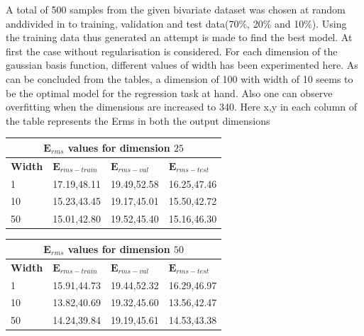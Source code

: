 A total of 500 samples from the given bivariate dataset was chosen at random anddivided  in  to  training,  validation  and  test  data(70\%,  20\%  and  10\%).   Using  the training data thus generated an attempt is made to find the best model.  At first the case without regularisation is considered.  For each dimension of the gaussian basis function, different values of width has been experimented here.  As can be concluded from the tables, a dimension of 100 with width of 10 seems to be the optimal model for the regression task at hand. Also one can observe overfitting when the dimensions are increased to 340. Here x,y in each column of the table represents the Erms in both the output dimensions

\newpage
{
\begin{table}[hptb]
\begin{tabular}{ |p{1.5cm}|p{3cm}|p{3cm}| p{3cm}|  }
\hline
\multicolumn{4}{|c|}{$\mathbf{E}_{rms}$ values for dimension $25$ } \\
\hline
\rowcolor{lightgray} \textbf{Width} & $\mathbf{E}_{rms-train}$ & $\mathbf{E}_{rms-val}$ & $\mathbf{E}_{rms-test}$ \\
\hline
  1   &   17.19,48.11   &    19.49,52.58      &     16.25,47.46 \\
 \hline
 10   &   15.23,43.45  &  19.17,45.01          &     15.50,42.72 \\
 \hline
 50   &   15.01,42.80  & 19.52,45.40 & 15.16,46.30 \\
\hline
\end{tabular}
\label{table:8}
\end{table}
}

{
\begin{table}[hptb]
\begin{tabular}{ |p{1.5cm}|p{3cm}|p{3cm}| p{3cm}|  }
\hline
\multicolumn{4}{|c|}{$\mathbf{E}_{rms}$ values for dimension $50$ } \\
\hline
\rowcolor{lightgray} \textbf{Width} & $\mathbf{E}_{rms-train}$ & $\mathbf{E}_{rms-val}$ & $\mathbf{E}_{rms-test}$ \\
\hline
  1   &   15.91,44.73   &    19.44,52.32      &     16.29,46.97 \\
 \hline
 10   &   13.82,40.69  &  19.32,45.60          &     13.56,42.47 \\
 \hline
 50   &   14.24,39.84  & 19.19,45.61 & 14.53,43.38 \\
\hline
\end{tabular}
\label{table:8}
\end{table}
}


